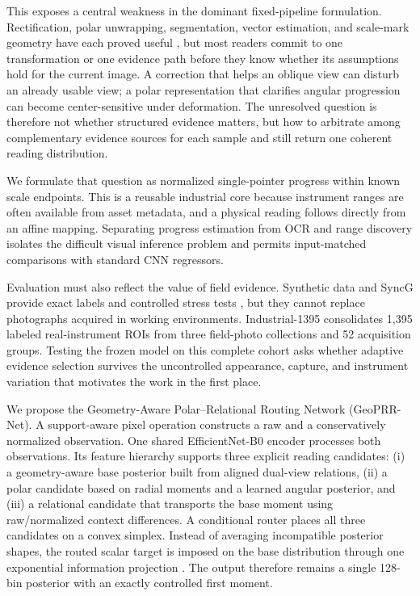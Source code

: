 \documentclass[electronics,article,submit,oneauthor]{Definitions/mdpi}
\newcommand{\modelname}{GeoPRR-Net\xspace}
\begin{document}
This exposes a central weakness in the dominant fixed-pipeline formulation. Rectification, polar unwrapping, segmentation, vector estimation, and scale-mark geometry have each proved useful \cite{bao2019ipm,li2020text,wu2021lowlight,dong2021vdn,wang2022scalemark,tan2024transunet}, but most readers commit to one transformation or one evidence path before they know whether its assumptions hold for the current image. A correction that helps an oblique view can disturb an already usable view; a polar representation that clarifies angular progression can become center-sensitive under deformation. The unresolved question is therefore not whether structured evidence matters, but how to arbitrate among complementary evidence sources for each sample and still return one coherent reading distribution.

We formulate that question as normalized single-pointer progress within known scale endpoints. This is a reusable industrial core because instrument ranges are often available from asset metadata, and a physical reading follows directly from an affine mapping. Separating progress estimation from OCR and range discovery isolates the difficult visual inference problem and permits input-matched comparisons with standard CNN regressors.

Evaluation must also reflect the value of field evidence. Synthetic data and SyncG provide exact labels and controlled stress tests \cite{howells2021analogue,leonalcazar2024synthetic,deng2026syncg}, but they cannot replace photographs acquired in working environments. Industrial-1395 consolidates 1,395 labeled real-instrument ROIs from three field-photo collections and 52 acquisition groups. Testing the frozen model on this complete cohort asks whether adaptive evidence selection survives the uncontrolled appearance, capture, and instrument variation that motivates the work in the first place.

We propose the Geometry-Aware Polar--Relational Routing Network (\modelname). A support-aware pixel operation constructs a raw and a conservatively normalized observation. One shared EfficientNet-B0 encoder \cite{tan2019efficientnet} processes both observations. Its feature hierarchy supports three explicit reading candidates: (i) a geometry-aware base posterior built from aligned dual-view relations, (ii) a polar candidate based on radial moments and a learned angular posterior, and (iii) a relational candidate that transports the base moment using raw/normalized context differences. A conditional router places all three candidates on a convex simplex. Instead of averaging incompatible posterior shapes, the routed scalar target is imposed on the base distribution through one exponential information projection \cite{csiszar1975idivergence}. The output therefore remains a single 128-bin posterior with an exactly controlled first moment.
\end{document}
